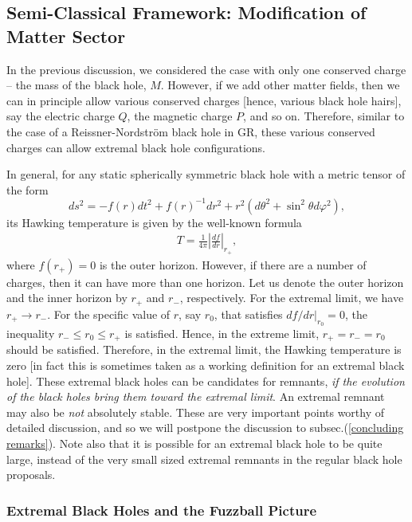 \documentclass[12pt]{article}
\newcommand{\2}{$^2$}
\newcommand{\3}{$^3$}
\newcommand{\4}{$_4$}
\newcommand{\5}{$_5$}
\begin{document}
\subsection{Semi-Classical Framework: Modification of Matter Sector}

In the previous discussion, we considered the case with only one conserved charge -- the mass of the black hole, $M$. However, if we add other matter fields, then we can in principle allow various conserved charges [hence, various black hole hairs], say the electric charge $Q$, the magnetic charge $P$, and so on. Therefore, similar to the case of a Reissner-Nordstr\"om black hole in GR, these various conserved charges can allow extremal black hole configurations.



In general, for any static spherically symmetric black hole with a metric tensor of the form
\begin{equation}
ds^2 = -f(r) dt^2 + f(r)^{-1}dr^2 + r^2(d\theta^2 + \sin^2\theta d\varphi^2),
\end{equation}
its Hawking temperature is given by the well-known formula
\begin{eqnarray}
T = \frac{1}{4\pi} \left|\frac{df}{dr}\right|_{r_{+}},
\end{eqnarray}
where $f(r_{+}) = 0$ is the outer horizon. However, if there are a number of charges, then it can have more than one horizon. Let us denote the outer horizon and the inner horizon by $r_{+}$ and $r_{-}$, respectively. For the extremal limit, we have $r_{+} \to r_{-}$. For the specific value of $r$, say $r_{0}$, that satisfies $df/dr|_{r_{0}} = 0$, the inequality $r_{-} \leqslant r_{0} \leqslant r_{+}$ is satisfied. Hence, in the extreme limit, $r_{+} = r_{-} = r_{0}$ should be satisfied. Therefore, in the extremal limit, the Hawking temperature is zero [in fact this is sometimes taken as a working definition for an extremal black hole]. These extremal black holes can be candidates for remnants, \emph{if the evolution of the black holes bring them toward the extremal limit}. An extremal remnant may also be \emph{not} absolutely stable. These are very important points worthy of detailed discussion, and so we will postpone the discussion to subsec.(\ref{concluding remarks}). 
Note also that it is possible for an extremal black hole to be quite large, instead of the very small sized extremal remnants in the regular black hole proposals.

\subsubsection{Extremal Black Holes and the Fuzzball Picture}
\end{document}
